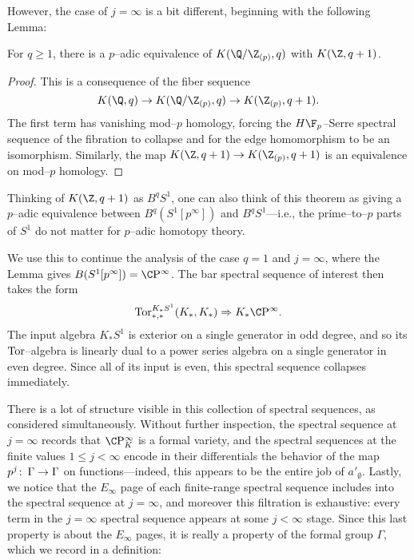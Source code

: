 However, the case of $j = \infty$ is a bit different, beginning with the following Lemma:

\begin{lemma}
For $q \ge 1$, there is a $p$--adic equivalence of $K(\Q/\Z_{(p)}, q)$ with $K(\Z, q+1)$.
\end{lemma}
\begin{proof}
This is a consequence of the fiber sequence \[K(\Q, q) \to K(\Q/\Z_{(p)}, q) \to K(\Z_{(p)}, q+1).\]  The first term has vanishing mod--$p$ homology, forcing the $H\F_p$--Serre spectral sequence of the fibration to collapse and for the edge homomorphism to be an isomorphism.  Similarly, the map $K(\Z, q+1) \to K(\Z_{(p)}, q+1)$ is an equivalence on mod--$p$ homology.
\end{proof}

\begin{remark}
Thinking of $K(\Z, q+1)$ as $B^q S^1$, one can also think of this theorem as giving a $p$--adic equivalence between $B^q(S^1[p^\infty])$ and $B^q S^1$---i.e., the prime--to--$p$ parts of $S^1$ do not matter for $p$--adic homotopy theory.
\end{remark}

We use this to continue the analysis of the case $q = 1$ and $j = \infty$, where the Lemma gives $B(S^1[p^\infty]) = \CP^\infty$.  The bar spectral sequence of interest then takes the form \[\Tor^{K_* S^1}_{*, *}(K_*, K_*) \Rightarrow K_* \CP^\infty.\]  The input algebra $K_* S^1$ is exterior on a single generator in odd degree, and so its $\operatorname{Tor}$--algebra is linearly dual to a power series algebra on a single generator in even degree.  Since all of its input is even, this spectral sequence collapses immediately.

There is a lot of structure visible in this collection of spectral sequences, as considered simultaneously.  Without further inspection, the spectral sequence at $j = \infty$ records that $\CP^\infty_K$ is a formal variety, and the spectral sequences at the finite values $1 \le j < \infty$ encode in their differentials the behavior of the map $p^j\colon\thinspace \Gamma \to \Gamma$ on functions---indeed, this appears to be the entire job of $a'_\emptyset$.  Lastly, we notice that the $E_\infty$ page of each finite-range spectral sequence includes into the spectral sequence at $j = \infty$, and moreover this filtration is exhaustive: every term in the $j = \infty$ spectral sequence appears at some $j < \infty$ stage.  Since this last property is about the $E_\infty$ pages, it is really a property of the formal group $\Gamma$, which we record in a definition:

